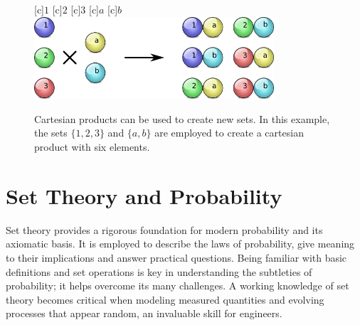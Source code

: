 \begin{figure}[htb]
\begin{center}
\begin{psfrags}
[c]{$1$}
[c]{$2$}
[c]{$3$}
[c]{$a$}
[c]{$b$}
\includegraphics[height=3.06cm]{Figures/1Chapter/cartesianproduct}
\end{psfrags}
\caption{Cartesian products can be used to create new sets.
In this example, the sets $\{ 1, 2, 3 \}$ and $\{ a, b \}$ are employed to create a cartesian product with six elements.}
\end{center}
\end{figure}


\section{Set Theory and Probability}

Set theory provides a rigorous foundation for modern probability and its axiomatic basis.
It is employed to describe the laws of probability, give meaning to their implications and answer practical questions.
Being familiar with basic definitions and set operations is key in understanding the subtleties of probability; it helps overcome its many challenges.
A working knowledge of set theory becomes critical when modeling measured quantities and evolving processes that appear random, an invaluable skill for engineers.

